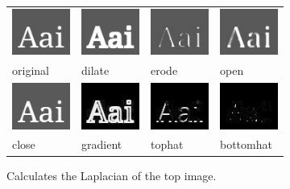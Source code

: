 \spc \begin{tabular}{llll}
\includegraphics[width=0.75in]{figures/morphsource.jpg} &
\includegraphics[width=0.75in]{figures/dilate.jpg} &
\includegraphics[width=0.75in]{figures/erode.jpg} &
\includegraphics[width=0.75in]{figures/morphopen.jpg} \\
original & dilate & erode & open \\
\includegraphics[width=0.75in]{figures/morphclose.jpg} &
\includegraphics[width=0.75in]{figures/morphgradient.jpg} &
\includegraphics[width=0.75in]{figures/tophat.jpg} &
\includegraphics[width=0.75in]{figures/bottomhat.jpg} \\
close & gradient & tophat & bottomhat \\
\end{tabular}

\apiend


Calculates the Laplacian of the top image.

